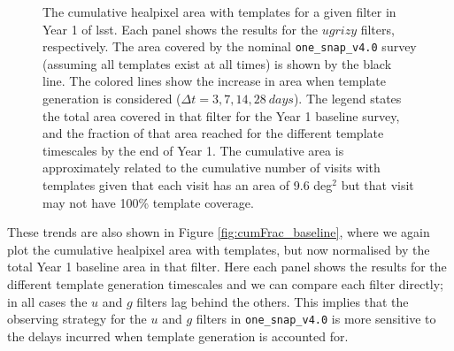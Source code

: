 \documentclass[preprintm,linenumbers]{aastex631}
\newcommand{\baseline}{\texttt{one\_snap\_v4.0}\xspace}
\begin{document}
\begin{figure}
			\caption{The cumulative healpixel area with templates for a given filter in Year 1 of \gls*{lsst}.
				Each panel shows the results for the $ugrizy$ filters, respectively.
				The area covered by the nominal \baseline survey (assuming all templates exist at all times) is shown by the black line.
				The colored lines show the increase in area when template generation is considered ($\Delta t = 3, 7, 14, 28\ \si{days}$).
				The legend states the total area covered in that filter for the Year 1 baseline survey, and the fraction of that area reached for the different template timescales by the end of Year 1.
				The cumulative area is approximately related to the cumulative number of visits with templates given that each visit has an area of 9.6 deg$^2$ but that visit may not have 100\% template coverage.
    }
			\label{fig:cum_baseline_filter}
			
		\end{figure}
  
		These trends are also shown in Figure \ref{fig:cumFrac_baseline}, where we again plot the cumulative healpixel area with templates,  but now normalised by the total Year 1 baseline area in that filter.
		Here each panel shows the results for the different template generation timescales and we can compare each filter directly; in all cases the $u$ and $g$ filters lag behind the others.
		This implies that the observing strategy for the $u$ and $g$ filters in \baseline is more sensitive to the delays incurred when template generation is accounted for.
\end{document}
